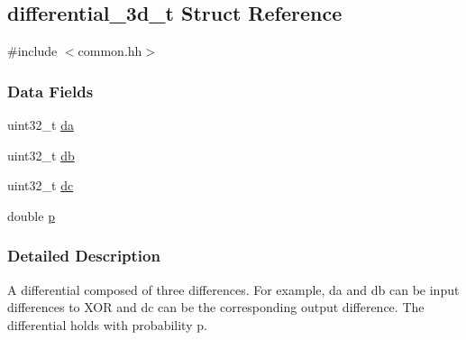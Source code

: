 \hypertarget{structdifferential__3d__t}{\subsection{differential\-\_\-3d\-\_\-t \-Struct \-Reference}
\label{structdifferential__3d__t}
}


{\ttfamily \#include $<$common.\-hh$>$}

\subsubsection*{\-Data \-Fields}
\begin{DoxyCompactItemize}
\item 
uint32\-\_\-t \hyperlink{structdifferential__3d__t_a919d7341177d47821256bd3fcecee5ac}{da}
\item 
uint32\-\_\-t \hyperlink{structdifferential__3d__t_af9070aa3529362eb2d0c4d05fc076f25}{db}
\item 
uint32\-\_\-t \hyperlink{structdifferential__3d__t_a4d88f84082f6d4f5ca5d51296f5b14f7}{dc}
\item 
double \hyperlink{structdifferential__3d__t_ae05166f2726fa29861fb01752f6c8c8a}{p}
\end{DoxyCompactItemize}


\subsubsection{\-Detailed \-Description}
\-A differential composed of three differences. \-For example, da and db can be input differences to \-X\-O\-R and dc can be the corresponding output difference. \-The differential holds with probability p. 

